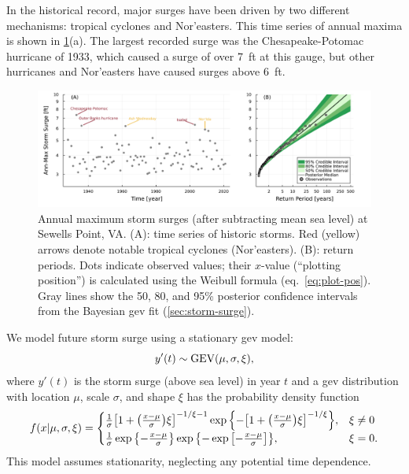 \documentclass[11pt]{article}
\begin{document}
In the historical record, major surges have been driven by two different mechanisms: tropical cyclones and Nor'easters.
This time series of annual maxima is shown in \cref{fig:surge-obs-return}(a).
The largest recorded surge was the Chesapeake-Potomac hurricane of 1933, which caused a surge of over \SI{7}{ft} at this gauge, but other hurricanes and Nor'easters have caused surges above \SI{6}{ft}.

\begin{figure}
    \centering
    \includegraphics[width=\textwidth]{surge-obs-return}
    \caption{
        Annual maximum storm surges (after subtracting mean sea level) at Sewells Point, VA.
        (A):
        time series of historic storms.
        Red (yellow) arrows denote notable tropical cyclones (Nor'easters).
        (B):
        return periods.
        Dots indicate observed values; their $x$-value (``plotting position'') is calculated using the Weibull formula (eq.~\ref{eq:plot-pos}).
        Gray lines show the 50, 80, and 95\% posterior confidence intervals from the Bayesian \gls{gev} fit (\cref{sec:storm-surge}).
    }\label{fig:surge-obs-return}
\end{figure}

We model future storm surge using a stationary \gls{gev} model:
\begin{equation}\label{eq:surge-model}
    y'(t) \sim \text{GEV}\qty(\mu, \sigma, \xi),
\end{equation}
where $y'(t)$ is the storm surge (above sea level) in year $t$ and a \gls{gev} distribution with location $\mu$, scale $\sigma$, and shape $\xi$ has the probability density function
\begin{equation*}
    f(x | \mu, \sigma, \xi)= \begin{cases}
        \frac{1}{\sigma} \qty[ 1 + \qty( \frac{x-\mu}{\sigma} ) \xi ]^{-1 / \xi - 1} \exp \qty{- \qty[1+\qty(\frac{x-\mu}{\sigma}) \xi ]^{-1 / \xi} }, & \xi \neq 0 \\
        \frac{1}{\sigma} \exp \qty{-\frac{x-\mu}{\sigma}} \exp \qty{ -\exp \qty[-\frac{x-\mu}{\sigma}]},                                               & \xi=0.
    \end{cases}
\end{equation*}
This model assumes stationarity, neglecting any potential time dependence.
\end{document}
